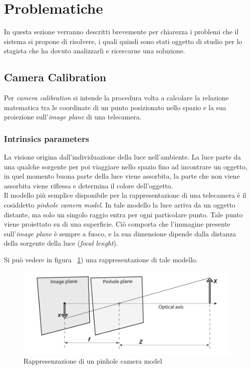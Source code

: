 \section{Problematiche} \label{sec:prob}
In questa sezione verranno descritti brevemente per chiarezza i problemi che il sistema si propone di risolvere, i quali quindi sono stati oggetto di studio per lo stagista che ha dovuto analizzarli e ricercarne una soluzione.
\subsection{Camera Calibration} \label{sec:camcalib}
Per \textit{camera calibration} si intende la procedura volta a calcolare la relazione matematica tra le coordinate di un punto posizionato nello spazio e la sua proiezione sull'\textit{image plane} di una telecamera. \\

\subsubsection{Intrinsics parameters}
La visione origina dall'individuazione della luce nell'ambiente. La luce parte da una qualche sorgente per poi viaggiare nello spazio fino ad incontrare un oggetto, in quel momento buona parte della luce viene assorbita, la parte che non viene assorbita viene riflessa e determina il colore dell'oggetto. \\

Il modello più semplice disponibile per la rappresentazione di una telecamera è il cosiddetto \textit{pinhole camera model}. In tale modello la luce arriva da un oggetto distante, ma solo un singolo raggio entra per ogni particolare punto. Tale punto viene proiettato su di una superficie. Ciò comporta che l'immagine presente sull'\textit{image plane} è sempre a fuoco, e la sua dimensione dipende dalla distanza della sorgente della luce (\textit{focal lenght}).

Si può vedere in figura ~\ref{fig:calib1}) una rappresentazione di tale modello.
\begin{figure}[htpb] 
\centering 
\includegraphics[scale=0.4]{./images/calib1.png} 
\caption{Rappresenzazione di un pinhole camera model} 
\label{fig:calib1}
\end{figure} 

